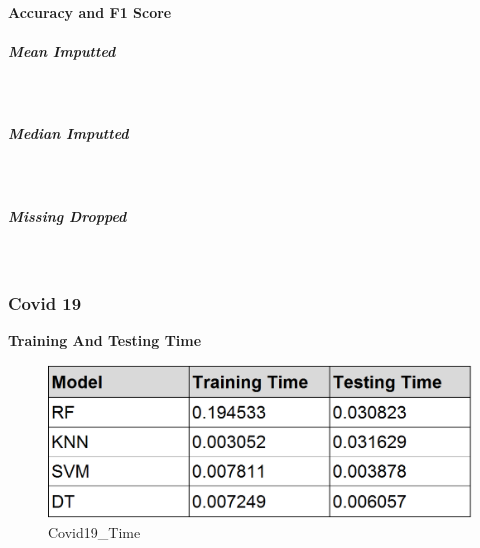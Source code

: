\documentclass[11pt]{article}
\begin{document}
    \textbf{Accuracy and F1 Score}

    \hypertarget{mean-imputted}{%
\subparagraph{Mean Imputted}\label{mean-imputted}}

    \begin{center}
    \end{center}
    { \hspace*{\fill} \\}
    
    \hypertarget{median-imputted}{%
\subparagraph{Median Imputted}\label{median-imputted}}

    \begin{center}
    \end{center}
    { \hspace*{\fill} \\}
    
    \hypertarget{missing-dropped}{%
\subparagraph{Missing Dropped}\label{missing-dropped}}

    \begin{center}
    \end{center}
    { \hspace*{\fill} \\}
    
    \hypertarget{covid-19}{%
\subsubsection{Covid 19}\label{covid-19}}

    \textbf{Training And Testing Time}

    \begin{figure}
\centering
\includegraphics{images/Covid19_Time.PNG}
\caption{Covid19\_Time}
\end{figure}
\end{document}
